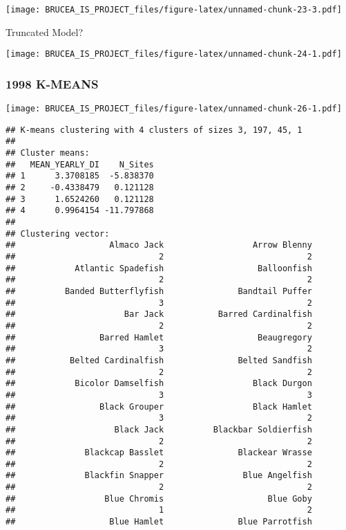 \documentclass[
]{article}
\begin{document}
\texttt{[image: BRUCEA\_IS\_PROJECT\_files/figure-latex/unnamed-chunk-23-3.pdf]}

Truncated Model?

\texttt{[image: BRUCEA\_IS\_PROJECT\_files/figure-latex/unnamed-chunk-24-1.pdf]}

\hypertarget{k-means}{%
\subsubsection{1998 K-MEANS}\label{k-means}}

\texttt{[image: BRUCEA\_IS\_PROJECT\_files/figure-latex/unnamed-chunk-26-1.pdf]}

\begin{verbatim}
## K-means clustering with 4 clusters of sizes 3, 197, 45, 1
## 
## Cluster means:
##   MEAN_YEARLY_DI    N_Sites
## 1      3.3708185  -5.838370
## 2     -0.4338479   0.121128
## 3      1.6524260   0.121128
## 4      0.9964154 -11.797868
## 
## Clustering vector:
##                   Almaco Jack                  Arrow Blenny 
##                             2                             2 
##            Atlantic Spadefish                   Balloonfish 
##                             2                             2 
##          Banded Butterflyfish               Bandtail Puffer 
##                             3                             2 
##                      Bar Jack           Barred Cardinalfish 
##                             2                             2 
##                 Barred Hamlet                   Beaugregory 
##                             3                             2 
##           Belted Cardinalfish               Belted Sandfish 
##                             2                             2 
##            Bicolor Damselfish                  Black Durgon 
##                             3                             3 
##                 Black Grouper                  Black Hamlet 
##                             3                             2 
##                    Black Jack          Blackbar Soldierfish 
##                             2                             2 
##              Blackcap Basslet               Blackear Wrasse 
##                             2                             2 
##              Blackfin Snapper                Blue Angelfish 
##                             2                             2 
##                  Blue Chromis                     Blue Goby 
##                             1                             2 
##                   Blue Hamlet               Blue Parrotfish 

\end{verbatim}
\end{document}
